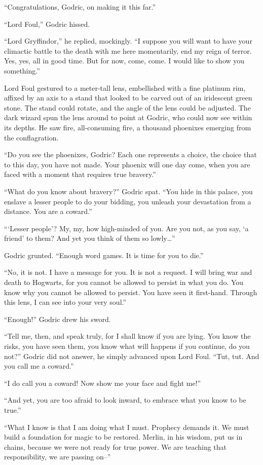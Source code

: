 “Congratulations, Godric, on making it this far.”

“Lord Foul,” Godric hissed.

“Lord Gryffindor,” he replied, mockingly. “I suppose you will want to have your climactic battle to the death with me here momentarily, end my reign of terror. Yes, yes, all in good time. But for now, come, come. I would like to show you something.”

Lord Foul gestured to a meter-tall lens, embellished with a fine platinum rim, affixed by an axis to a stand that looked to be carved out of an iridescent green stone. The stand could rotate, and the angle of the lens could be adjusted. The dark wizard spun the lens around to point at Godric, who could now see within its depths. He saw fire, all-consuming fire, a thousand phoenixes emerging from the conflagration.

“Do you see the phoenixes, Godric? Each one represents a choice, the choice that to this day, you have not made. Your phoenix will one day come, when you are faced with a moment that requires true bravery.”

“What do you know about bravery?” Godric spat. “You hide in this palace, you enslave a lesser people to do your bidding, you unleash your devastation from a distance. You are a coward.”

“‘Lesser people’? My, my, how high-minded of you. Are you not, as you say, ‘a friend’ to them? And yet you think of them so lowly…”

Godric grunted. “Enough word games. It is time for you to die.”

“No, it is not. I have a message for you. It is not a request. I will bring war and death to Hogwarts, for you cannot be allowed to persist in what you do. You know why you cannot be allowed to persist. You have seen it first-hand. Through this lens, I can see into your very soul.”

“Enough!” Godric drew his sword.

“Tell me, then, and speak truly, for I shall know if you are lying. You know the risks, you have seen them, you know what will happens if you continue, do you not?” Godric did not answer, he simply advanced upon Lord Foul. “Tut, tut. And you call me a coward.”

“I do call you a coward! Now show me your face and fight me!”

“And yet, you are too afraid to look inward, to embrace what you know to be true.”

“What I know is that I am doing what I must. Prophecy demands it. We must build a foundation for magic to be restored. Merlin, in his wisdom, put us in chains, because we were not ready for true power. We are teaching that responsibility, we are passing on–”

